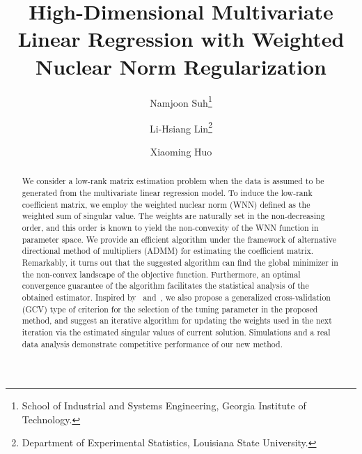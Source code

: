 \documentclass[12pt]{article}
\begin{document}
\def\spacingset#1{\renewcommand{\baselinestretch}%
{#1}\small\normalsize} \spacingset{1}


\title{High-Dimensional Multivariate Linear Regression with Weighted Nuclear Norm Regularization} 
\author{Namjoon Suh\thanks{School of Industrial and Systems Engineering, Georgia Institute of Technology.} \and 
Li-Hsiang Lin\thanks{Department of Experimental Statistics, Louisiana State University.} \and 
Xiaoming Huo \footnotemark[1]}

\maketitle
\begin{abstract}
We consider a low-rank matrix estimation problem when the data is assumed to be generated from the multivariate linear regression model. 
To induce the low-rank coefficient matrix, we employ the weighted nuclear norm (WNN) defined as the weighted sum of singular value. 
The weights are naturally set in the non-decreasing order, and this order is known to yield the non-convexity of the WNN function in parameter space. 
We provide an efficient algorithm under the framework of alternative directional method of multipliers (ADMM) for estimating the coefficient matrix. 
Remarkably, it turns out that the suggested algorithm can find the global minimizer in the non-convex landscape of the objective function.
Furthermore, an optimal convergence guarantee of the algorithm facilitates the statistical analysis of the obtained estimator.
Inspired by~\citet{yuan2007dimension} and~\cite{candes2008enhancing},
we also propose a generalized cross-validation (GCV) type of criterion for the selection of the tuning parameter in the proposed method, and suggest an iterative algorithm for updating the weights used in the next iteration via the estimated singular values of current solution.
Simulations and a real data analysis demonstrate competitive performance of our new method.
\end{abstract}


\spacingset{1.5} %
\end{document}
